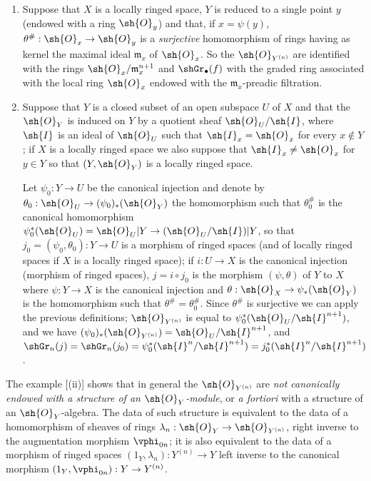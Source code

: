 \begin{examples}[16.1.3]
\label{IV.16.1.3}
\medskip\noindent
\begin{enumerate}
  \item[(i)] Suppose that $X$ is a locally ringed space, $Y$ is reduced to a single point $y$ (endowed with a ring $\sh{O}_y$) and that, if $x = \psi(y)$, $\theta^\#:\sh{O}_x \to \sh{O}_y$ is a \emph{surjective} homomorphism of rings having as kernel the maximal ideal $\mathfrak{m}_x$ of $\sh{O}_x$.
  So the $\sh{O}_{Y^{(n)}}$ are identified with the rings $\sh{O}_x/\mathfrak{m}_x^{n+1}$ and $\shGr_\bullet(f)$ with the graded ring associated with the local ring $\sh{O}_x$ endowed with the $\mathfrak{m}_x$-preadic filtration.
  \item[(ii)] Suppose that $Y$ is a closed subset of an open subspace $U$ of $X$ and that the $\sh{O}_Y$ is induced on $Y$ by a quotient sheaf $\sh{O}_U/\sh{I}$, where $\sh{I}$ is an ideal of $\sh{O}_U$ such that $\sh{I}_x = \sh{O}_x$ for every $x \not\in Y$;
  if $X$ is a locally ringed space we also suppose that $\sh{I}_x \neq \sh{O}_x$ for $y \in Y$ so that $(Y, \sh{O}_Y)$ is a locally ringed space.
  
  Let $\psi_0: Y \to U$ be the canonical injection and denote by $\theta_0: \sh{O}_U \to (\psi_0)_*(\sh{O}_Y)$ the homomorphism such that $\theta_0^\#$ is the canonical homomorphism $\psi^*_0(\sh{O}_U) = \sh{O}_U|Y \to (\sh{O}_U/\sh{I})|Y$, so that $j_0=(\psi_0, \theta_0):Y \to U$ is a morphism of ringed spaces (and of locally ringed spaces if $X$ is a locally ringed space);
  if $i:U \to X$ is the canonical injection (morphism of ringed spaces), $j = i\circ j_0$ is the morphism $(\psi, \theta)$ of $Y$ to $X$ where $\psi: Y \to X$ is the canonical injection and $\theta:\sh{O}_X \to \psi_*(\sh{O}_Y)$ is the homomorphism such that $\theta^\# = \theta_0^\#$.
  Since $\theta^\#$ is surjective we can apply the previous definitions;
  $\sh{O}_{Y^{(n)}}$ is equal to $\psi^*_0(\sh{O}_U/\sh{I}^{n+1})$, and we have $(\psi_0)_*(\sh{O}_{Y^{(n)}} ) = \sh{O}_U/\sh{I}^{n+1}$, and $\shGr_n(j) = \shGr_n(j_0) = \psi^*_0(\sh{I}^n/\sh{I}^{n+1}) = j^*_0(\sh{I}^n/\sh{I}^{n+1})$.
\end{enumerate}
\end{examples}

\begin{env}[16.1.4]
\label{IV.16.1.4}
The example [(ii)] shows that in general the $\sh{O}_{Y^{(n)}}$ are \emph{not canonically endowed with a structure of an $\sh{O}_Y$-module}, or \emph{a fortiori} with a structure of an $\sh{O}_Y$-algebra.
The data of such structure is equivalent to the data of a homomorphism of sheaves of rings $\lambda_n:\sh{O}_Y \to \sh{O}_{Y^{(n)}}$, right inverse to the augmentation morphism $\vphi_{0n}$;
it is also equivalent to the data of a morphism of ringed spaces $(1_Y, \lambda_n): Y^{(n)} \to Y$ left inverse to the canonical morphism $(1_Y, \vphi_{0n}): Y \to Y^{(n)}$.
\end{env}

